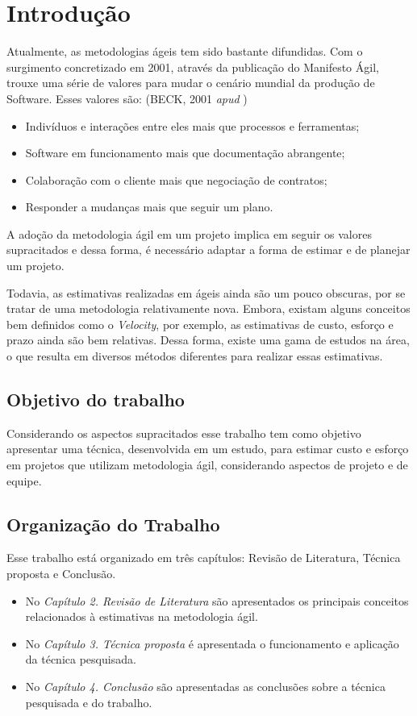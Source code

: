 \chapter[Introdução]{Introdução}

  Atualmente, as metodologias ágeis tem sido bastante difundidas. Com o surgimento concretizado em 2001, através
  da publicação do Manifesto Ágil, trouxe uma série de valores para mudar o cenário mundial da produção de Software. Esses valores são: (BECK, 2001 \textit{apud} )
  
  \begin{itemize}
   \item Indivíduos e interações entre eles mais que processos e ferramentas;
   \item Software em funcionamento mais que documentação abrangente;
   \item Colaboração com o cliente mais que negociação de contratos;
   \item Responder a mudanças mais que seguir um plano.
  \end{itemize}
  
  A adoção da metodologia ágil em um projeto implica em seguir os valores supracitados e dessa forma,
  é necessário adaptar a forma de estimar e de planejar um projeto. 

  Todavia, as estimativas realizadas em ágeis ainda são um pouco obscuras, por se tratar de uma metodologia relativamente nova. Embora, existam alguns conceitos
  bem definidos como o \textit{Velocity}, por exemplo, as estimativas de custo, esforço e prazo ainda são bem relativas. Dessa forma, existe uma gama de estudos na área, o que resulta em diversos métodos diferentes para realizar essas estimativas.

\section{Objetivo do trabalho}

	Considerando os aspectos supracitados esse trabalho tem como objetivo apresentar uma técnica, desenvolvida em um estudo, para estimar custo e esforço
	em projetos que utilizam metodologia ágil, considerando aspectos de projeto e de equipe.

\section{Organização do Trabalho}

	Esse trabalho está organizado em três capítulos: Revisão de Literatura, Técnica proposta e Conclusão.

	\begin{itemize}
		\item No \textit{Capítulo 2. Revisão de Literatura} são apresentados os principais conceitos relacionados à estimativas na metodologia ágil.
    	\item No \textit{Capítulo 3. Técnica proposta} é apresentada o funcionamento e aplicação da técnica pesquisada.
    	\item No \textit{Capítulo 4. Conclusão} são apresentadas as conclusões sobre a técnica pesquisada e do trabalho.
	\end{itemize}


